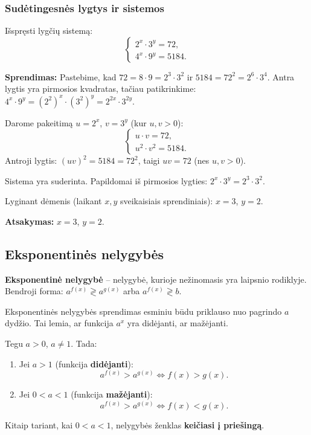 \subsubsection*{Sudėtingesnės lygtys ir sistemos}

\begin{example}
Išspręsti lygčių sistemą:
\[
\begin{cases}
2^x \cdot 3^y = 72, \\
4^x \cdot 9^y = 5184.
\end{cases}
\]

\textbf{Sprendimas:} Pastebime, kad $72 = 8 \cdot 9 = 2^3 \cdot 3^2$ ir 
$5184 = 72^2 = 2^6 \cdot 3^4$. Antra lygtis yra pirmosios kvadratas, tačiau 
patikrinkime: $4^x \cdot 9^y = (2^2)^x \cdot (3^2)^y = 2^{2x} \cdot 3^{2y}$.

Darome pakeitimą $u = 2^x$, $v = 3^y$ (kur $u, v > 0$):
\[
\begin{cases}
u \cdot v = 72, \\
u^2 \cdot v^2 = 5184.
\end{cases}
\]
Antroji lygtis: $(uv)^2 = 5184 = 72^2$, taigi $uv = 72$ (nes $u,v>0$). 

Sistema yra suderinta. Papildomai iš pirmosios lygties: $2^x \cdot 3^y = 2^3 \cdot 3^2$.

Lyginant dėmenis (laikant $x, y$ sveikaisiais sprendiniais):
$x = 3$, $y = 2$.

\textbf{Atsakymas:} $x = 3$, $y = 2$.
\end{example}

\subsection{Eksponentinės nelygybės}

\begin{definition}
\textbf{Eksponentinė nelygybė} – nelygybė, kurioje nežinomasis yra laipsnio rodiklyje. 
Bendroji forma: $a^{f(x)} \gtrless a^{g(x)}$ arba $a^{f(x)} \gtrless b$.
\end{definition}

Eksponentinės nelygybės sprendimas esminiu būdu priklauso nuo pagrindo $a$ dydžio. 
Tai lemia, ar funkcija $a^x$ yra didėjanti, ar mažėjanti.

\begin{theorem}
Tegu $a > 0$, $a \neq 1$. Tada:
\begin{enumerate}
    \item Jei $a > 1$ (funkcija \textbf{didėjanti}):
    \[
    a^{f(x)} > a^{g(x)} \iff f(x) > g(x).
    \]
    \item Jei $0 < a < 1$ (funkcija \textbf{mažėjanti}):
    \[
    a^{f(x)} > a^{g(x)} \iff f(x) < g(x).
    \]
\end{enumerate}
Kitaip tariant, kai $0 < a < 1$, nelygybės ženklas \textbf{keičiasi į priešingą}.
\end{theorem}

